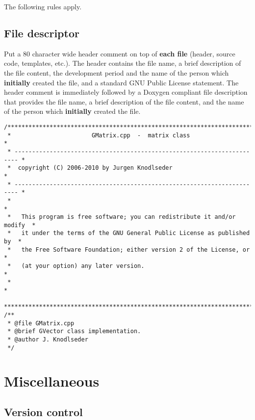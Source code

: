 \documentclass{article}[12pt,a4]
\begin{document}
The following rules apply.


\subsection{File descriptor}

Put a 80 character wide header comment on top of {\bf each file}
(header, source code, templates, etc.).
The header contains
the file name,
a brief description of the file content,
the development period and the name of the person which {\bf initially}
created the file, and
a standard GNU Public License statement.
The header comment is immediately followed by a Doxygen compliant
file description that provides
the file name,
a brief description of the file content, and
the name of the person which {\bf initially} created the file.
\begin{verbatim}
/***************************************************************************
 *                       GMatrix.cpp  -  matrix class                      *
 * ----------------------------------------------------------------------- *
 *  copyright (C) 2006-2010 by Jurgen Knodlseder                           *
 * ----------------------------------------------------------------------- *
 *                                                                         *
 *   This program is free software; you can redistribute it and/or modify  *
 *   it under the terms of the GNU General Public License as published by  *
 *   the Free Software Foundation; either version 2 of the License, or     *
 *   (at your option) any later version.                                   *
 *                                                                         *
 ***************************************************************************/
/**
 * @file GMatrix.cpp
 * @brief GVector class implementation.
 * @author J. Knodlseder
 */
\end{verbatim}


\section{Miscellaneous}

\subsection{Version control}
\end{document}
